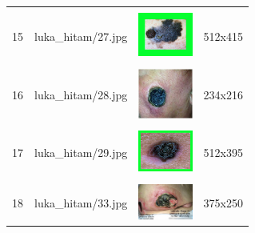 \begin{table}[H]
\begin{tabular}{|m{0.2in}|m{1.2in}|m{0.7in}|m{0.7in}|}
		& &  &  \\
		15 & 
		luka\_hitam/27.jpg &
		\includegraphics[width=0.7in]{gambar/dataset_citra/luka_hitam/27.jpg}&
		512x415\\
		\hline
		
		& &  &  \\
		16 & 
		luka\_hitam/28.jpg &
		\includegraphics[width=0.7in]{gambar/dataset_citra/luka_hitam/28.jpg}&
		234x216\\
		\hline
		
		& &  &  \\
		17 & 
		luka\_hitam/29.jpg &
		\includegraphics[width=0.7in]{gambar/dataset_citra/luka_hitam/29.jpg}&
		512x395\\
		\hline
	
		& &  &  \\
		18& 
		luka\_hitam/33.jpg &
		\includegraphics[width=0.7in]{gambar/dataset_citra/luka_hitam/33.jpg}&
		375x250\\
		\hline

	\end{tabular}
\end{table}

